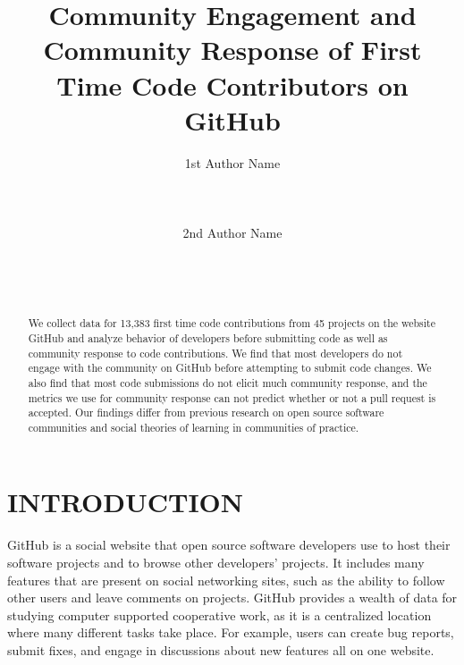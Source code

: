 \documentclass{sigchi}
\begin{document}
\title{Community Engagement and Community Response of First Time Code Contributors on GitHub}

\author{
  \alignauthor 1st Author Name\\
    \\
    \\
    \\
  \alignauthor 2nd Author Name\\
    \\
    \\
    \\
}

\maketitle                %



\begin{abstract}           %
We collect data for 13,383 first time code contributions from 45 projects on the
website GitHub and analyze behavior of developers before submitting code as well
as community response to code contributions. We find that most developers do not
engage with the community on GitHub before attempting to submit code changes. We
also find that most code submissions do not elicit much community response, and
the metrics we use for community response can not predict whether or not a pull
request is accepted. Our findings differ from previous research on open source
software communities and social theories of learning in communities of practice.
\end{abstract}

\section{INTRODUCTION}

GitHub is a social website that open source software developers use to host
their software projects and to browse other developers' projects. It includes
many features that are present on social networking sites, such as the ability
to follow other users and leave comments on projects. GitHub provides a wealth
of data for studying computer supported cooperative work, as it is a
centralized location where many different tasks take place. For example, users
can create bug reports, submit fixes, and engage in discussions about new
features all on one website.
\end{document}
